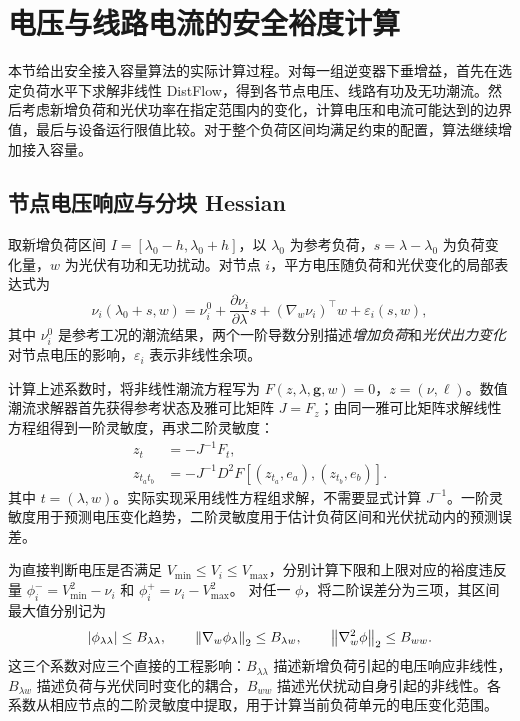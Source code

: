 \section{电压与线路电流的安全裕度计算}\label{sec:method}

本节给出安全接入容量算法的实际计算过程。对每一组逆变器下垂增益，首先在选定负荷水平下求解非线性 DistFlow，得到各节点电压、线路有功及无功潮流。然后考虑新增负荷和光伏功率在指定范围内的变化，计算电压和电流可能达到的边界值，最后与设备运行限值比较。对于整个负荷区间均满足约束的配置，算法继续增加接入容量。

\subsection{节点电压响应与分块 Hessian}\label{sec:hess}

取新增负荷区间 $I=[\lambda_0-h,\lambda_0+h]$，以 $\lambda_0$ 为参考负荷，$s=\lambda-\lambda_0$ 为负荷变化量，$w$ 为光伏有功和无功扰动。对节点 $i$，平方电压随负荷和光伏变化的局部表达式为
\begin{equation}
\nu_i(\lambda_0+s,w)
=\nu_i^0+\frac{\partial\nu_i}{\partial\lambda}s+
(\nabla_w\nu_i)^\top w+\varepsilon_i(s,w),
\label{eq:voltage_local}
\end{equation}
其中 $\nu_i^0$ 是参考工况的潮流结果，两个一阶导数分别描述\emph{增加负荷}和\emph{光伏出力变化}对节点电压的影响，$\varepsilon_i$ 表示非线性余项。

计算上述系数时，将非线性潮流方程写为 $F(z,\lambda,\bm g,w)=0$，$z=(\nu,\ell)$。数值潮流求解器首先获得参考状态及雅可比矩阵 $J=F_z$；由同一雅可比矩阵求解线性方程组得到一阶灵敏度，再求二阶灵敏度：
\begin{align}
z_t&=-J^{-1}F_t,\label{eq:zt}\\
z_{t_at_b}&=-J^{-1}D^2F[(z_{t_a},e_a),(z_{t_b},e_b)] .
\label{eq:ztt}
\end{align}
其中 $t=(\lambda,w)$。实际实现采用线性方程组求解，不需要显式计算 $J^{-1}$。一阶灵敏度用于预测电压变化趋势，二阶灵敏度用于估计负荷区间和光伏扰动内的预测误差。

为直接判断电压是否满足 $V_{\min}\le V_i\le V_{\max}$，分别计算下限和上限对应的裕度违反量
$\phi_i^-=V_{\min}^2-\nu_i$ 和 $\phi_i^+=\nu_i-V_{\max}^2$。
对任一 $\phi$，将二阶误差分为三项，其区间最大值分别记为
\begin{equation}
|\phi_{\lambda\lambda}|\le B_{\lambda\lambda},\qquad
\left\lVert\nabla_w\phi_\lambda\right\rVert_2\le B_{\lambda w},\qquad
\left\lVert\nabla_w^2\phi\right\rVert_2\le B_{ww}.
\label{eq:blocks}
\end{equation}
这三个系数对应三个直接的工程影响：$B_{\lambda\lambda}$ 描述新增负荷引起的电压响应非线性，$B_{\lambda w}$ 描述负荷与光伏同时变化的耦合，$B_{ww}$ 描述光伏扰动自身引起的非线性。各系数从相应节点的二阶灵敏度中提取，用于计算当前负荷单元的电压变化范围。


